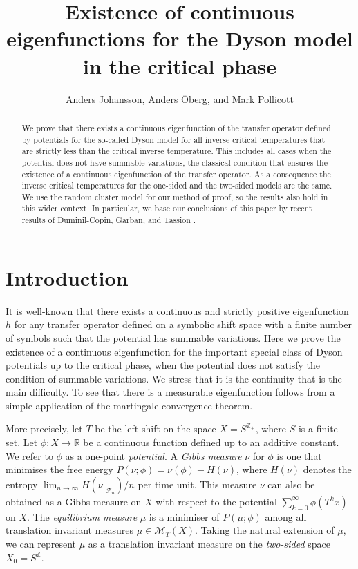 \documentclass[11pt, a4paper]{amsart}
\title[Existence of continuous eigenfunction]{Existence of continuous eigenfunctions for the Dyson model in the critical phase}
\author{Anders Johansson, Anders \"Oberg, and Mark Pollicott}
\date{}
\theoremstyle{definition}
\theoremstyle{remark}
\providecommand{\RR}{\mathbb{R}}
\providecommand{\ZZ}{\mathbb{Z}}
\providecommand{\CF}{\mathscr{F}}
\providecommand{\CM}{\mathscr{M}}
\def\X{X}
\def\T{T}
\begin{document}
\maketitle
\begin{abstract}
  We prove that there exists a continuous eigenfunction of the transfer operator
  defined by potentials for the so-called Dyson model for all inverse critical
  temperatures that are strictly less than the critical inverse temperature.
  This includes all cases when the potential does not have summable variations,
  the classical condition that ensures the existence of a continuous
  eigenfunction of the transfer operator. As a consequence the inverse critical
  temperatures for the one-sided and the two-sided models are the same. We use
  the random cluster model for our method of proof, so the results also hold in
  this wider context. In particular, we base our conclusions of this paper by
  recent results of Duminil-Copin, Garban, and Tassion \cite{duminil}.
\end{abstract}
\def\h{h}


\section{Introduction}\noindent

It is well-known \cite{walters1} that there exists a continuous and strictly
positive eigenfunction $h$ for any transfer operator defined on a symbolic shift
space with a finite number of symbols such that the potential has summable
variations. Here we prove the existence of a continuous eigenfunction for the
important special class of Dyson potentials up to the critical phase, when the
potential does not satisfy the condition of summable variations. We stress that
it is the continuity that is the main difficulty. To see that there is a
measurable eigenfunction follows from a simple application of the martingale
convergence theorem.

More precisely, let $\T$ be the left shift on the space $\X=S^{{\mathbb Z}_+}$,
where $S$ is a finite set. Let $\phi:\X\to \RR$ be a continuous function defined up
to an additive constant. We refer to $\phi$ as a one-point \emph{potential}. A
\emph{Gibbs measure} $\nu$ for $\phi$ is one that minimises the free energy
$P(\nu;\phi)=\nu(\phi)-H(\nu)$, where $H(\nu)$ denotes the entropy
$\lim_{n\to\infty} H(\nu\vert_{\CF_n})/n$ per time unit. This measure $\nu$ can also be
obtained as a Gibbs measure on $\X$ with respect to the potential
$\sum_{k=0}^\infty \phi(\T^k x)$ on $\X$. The \emph{equilibrium measure} $\mu$ is a minimiser
of $P(\mu;\phi)$ among all translation invariant measures $\mu\in{\CM}_T(\X)$. Taking the
natural extension of $\mu$, we can represent $\mu$ as a translation invariant
measure on the \emph{two-sided} space $\X_0 = S^\ZZ$.
\end{document}
